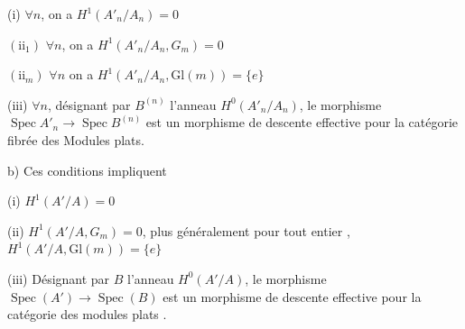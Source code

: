 (i) $\forall n$, on a $H^1(A'_n/A_n)=0$

$(\mathrm{ii}_1)$ $\forall n$, on a $H^1(A'_n/A_n,G_m)=0$

$(\mathrm{ii}_m)$ $\forall n$ on a $H^1(A'_n/A_n,\mathrm{Gl}(m))=\{e\}$

(iii) $\forall n$, désignant par $B^{(n)}$ l'anneau $H^0(A'_n/A_n)$,
le morphisme $\operatorname{Spec} A'_n\to\operatorname{Spec} B^{(n)}$ est un morphisme
de descente effective pour la catégorie fibrée des
Modules  plats.

b) Ces conditions impliquent

(i) $H^1(A'/A)=0$

(ii) $H^1(A'/A,G_m)=0$, plus généralement pour tout
entier , $H^1(A'/A,\mathrm{Gl}(m))=\{e\}$

(iii) Désignant par $B$ l'anneau $H^0(A'/A)$,
le morphisme $\operatorname{Spec}(A')\to\operatorname{Spec}(B)$ est un
morphisme de descente effective pour la catégorie
des modules plats .

